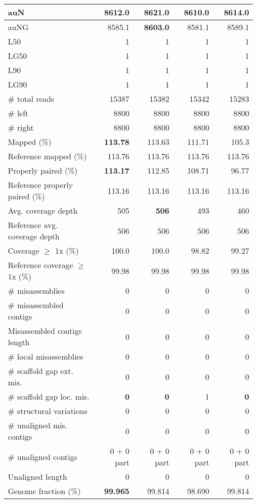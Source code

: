 \documentclass[12pt,a4paper]{article}
\begin{document}
\begin{table}[ht]
\begin{center}
\begin{tabular}{|l*{4}{|r}|}
auN & 8612.0 & {\bf 8621.0} & 8610.0 & 8614.0 \\ \hline
auNG & 8585.1 & {\bf 8603.0} & 8581.1 & 8589.1 \\ \hline
L50 & 1 & 1 & 1 & 1 \\ \hline
LG50 & 1 & 1 & 1 & 1 \\ \hline
L90 & 1 & 1 & 1 & 1 \\ \hline
LG90 & 1 & 1 & 1 & 1 \\ \hline
\# total reads & 15387 & 15382 & 15342 & 15283 \\ \hline
\# left & 8800 & 8800 & 8800 & 8800 \\ \hline
\# right & 8800 & 8800 & 8800 & 8800 \\ \hline
Mapped (\%) & {\bf 113.78} & 113.63 & 111.71 & 105.3 \\ \hline
Reference mapped (\%) & 113.76 & 113.76 & 113.76 & 113.76 \\ \hline
Properly paired (\%) & {\bf 113.17} & 112.85 & 108.71 & 96.77 \\ \hline
Reference properly paired (\%) & 113.16 & 113.16 & 113.16 & 113.16 \\ \hline
Avg. coverage depth & 505 & {\bf 506} & 493 & 460 \\ \hline
Reference avg. coverage depth & 506 & 506 & 506 & 506 \\ \hline
Coverage $\geq$ 1x (\%) & 100.0 & 100.0 & 98.82 & 99.27 \\ \hline
Reference coverage $\geq$ 1x (\%) & 99.98 & 99.98 & 99.98 & 99.98 \\ \hline
\# misassemblies & 0 & 0 & 0 & 0 \\ \hline
\# misassembled contigs & 0 & 0 & 0 & 0 \\ \hline
Misassembled contigs length & 0 & 0 & 0 & 0 \\ \hline
\# local misassemblies & 0 & 0 & 0 & 0 \\ \hline
\# scaffold gap ext. mis. & 0 & 0 & 0 & 0 \\ \hline
\# scaffold gap loc. mis. & {\bf 0} & {\bf 0} & 1 & {\bf 0} \\ \hline
\# structural variations & 0 & 0 & 0 & 0 \\ \hline
\# unaligned mis. contigs & 0 & 0 & 0 & 0 \\ \hline
\# unaligned contigs & 0 + 0 part & 0 + 0 part & 0 + 0 part & 0 + 0 part \\ \hline
Unaligned length & 0 & 0 & 0 & 0 \\ \hline
Genome fraction (\%) & {\bf 99.965} & 99.814 & 98.690 & 99.814 \\ \hline

\end{tabular}
\end{center}
\end{table}
\end{document}
